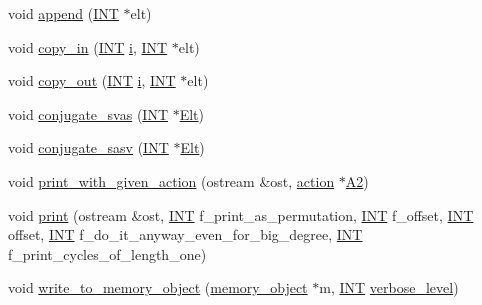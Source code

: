 \begin{DoxyCompactItemize}
\item 
void \mbox{\hyperlink{classvector__ge_a6e24ff78ee23cd3e94b266038f059e83}{append}} (\mbox{\hyperlink{galois_8h_a09fddde158a3a20bd2dcadb609de11dc}{I\+NT}} $\ast$elt)
\item 
void \mbox{\hyperlink{classvector__ge_ad02ebf2d4e8bbf095685aea921999145}{copy\+\_\+in}} (\mbox{\hyperlink{galois_8h_a09fddde158a3a20bd2dcadb609de11dc}{I\+NT}} \mbox{\hyperlink{alphabet2_8_c_acb559820d9ca11295b4500f179ef6392}{i}}, \mbox{\hyperlink{galois_8h_a09fddde158a3a20bd2dcadb609de11dc}{I\+NT}} $\ast$elt)
\item 
void \mbox{\hyperlink{classvector__ge_a3fd040b3b6f1227bd4a7696aba0adf37}{copy\+\_\+out}} (\mbox{\hyperlink{galois_8h_a09fddde158a3a20bd2dcadb609de11dc}{I\+NT}} \mbox{\hyperlink{alphabet2_8_c_acb559820d9ca11295b4500f179ef6392}{i}}, \mbox{\hyperlink{galois_8h_a09fddde158a3a20bd2dcadb609de11dc}{I\+NT}} $\ast$elt)
\item 
void \mbox{\hyperlink{classvector__ge_a8b245f21a8fead39b00df7b18593ea44}{conjugate\+\_\+svas}} (\mbox{\hyperlink{galois_8h_a09fddde158a3a20bd2dcadb609de11dc}{I\+NT}} $\ast$\mbox{\hyperlink{simeon_8_c_aec1406935bdb1fee3561fcb840964100}{Elt}})
\item 
void \mbox{\hyperlink{classvector__ge_ab244736f9f689bd80c490563fa63ae5d}{conjugate\+\_\+sasv}} (\mbox{\hyperlink{galois_8h_a09fddde158a3a20bd2dcadb609de11dc}{I\+NT}} $\ast$\mbox{\hyperlink{simeon_8_c_aec1406935bdb1fee3561fcb840964100}{Elt}})
\item 
void \mbox{\hyperlink{classvector__ge_a147cd0ba8b3cd85cde4b0581167bdc59}{print\+\_\+with\+\_\+given\+\_\+action}} (ostream \&ost, \mbox{\hyperlink{classaction}{action}} $\ast$\mbox{\hyperlink{simeon_8_c_a13fda35b8976a20080ec22b9d9e44e5b}{A2}})
\item 
void \mbox{\hyperlink{classvector__ge_a146d9cb5c5f3cf203d35e6a0ba295f9a}{print}} (ostream \&ost, \mbox{\hyperlink{galois_8h_a09fddde158a3a20bd2dcadb609de11dc}{I\+NT}} f\+\_\+print\+\_\+as\+\_\+permutation, \mbox{\hyperlink{galois_8h_a09fddde158a3a20bd2dcadb609de11dc}{I\+NT}} f\+\_\+offset, \mbox{\hyperlink{galois_8h_a09fddde158a3a20bd2dcadb609de11dc}{I\+NT}} offset, \mbox{\hyperlink{galois_8h_a09fddde158a3a20bd2dcadb609de11dc}{I\+NT}} f\+\_\+do\+\_\+it\+\_\+anyway\+\_\+even\+\_\+for\+\_\+big\+\_\+degree, \mbox{\hyperlink{galois_8h_a09fddde158a3a20bd2dcadb609de11dc}{I\+NT}} f\+\_\+print\+\_\+cycles\+\_\+of\+\_\+length\+\_\+one)
\item 
void \mbox{\hyperlink{classvector__ge_a1cffa952edafd4ae7c350437a9d68106}{write\+\_\+to\+\_\+memory\+\_\+object}} (\mbox{\hyperlink{classmemory__object}{memory\+\_\+object}} $\ast$m, \mbox{\hyperlink{galois_8h_a09fddde158a3a20bd2dcadb609de11dc}{I\+NT}} \mbox{\hyperlink{simeon_8_c_a818073fbcc2f439e7c56952f67386122}{verbose\+\_\+level}})

\end{DoxyCompactItemize}
